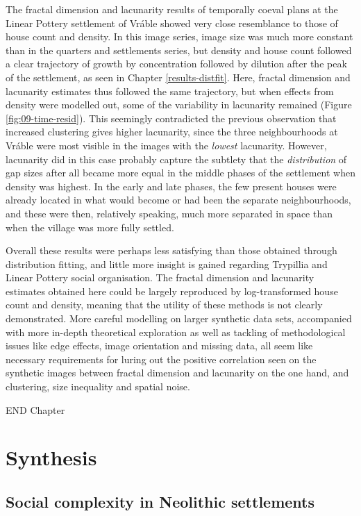 \documentclass[
  12pt,
  a4paper, twoside]{book}
\begin{document}
The fractal dimension and lacunarity results of temporally coeval plans at the Linear Pottery settlement of Vráble showed very close resemblance to those of house count and density. In this image series, image size was much more constant than in the quarters and settlements series, but density and house count followed a clear trajectory of growth by concentration followed by dilution after the peak of the settlement, as seen in Chapter \ref{results-distfit}. Here, fractal dimension and lacunarity estimates thus followed the same trajectory, but when effects from density were modelled out, some of the variability in lacunarity remained (Figure \ref{fig:09-time-resid}). This seemingly contradicted the previous observation that increased clustering gives higher lacunarity, since the three neighbourhoods at Vráble were most visible in the images with the \emph{lowest} lacunarity. However, lacunarity did in this case probably capture the subtlety that the \emph{distribution} of gap sizes after all became more equal in the middle phases of the settlement when density was highest. In the early and late phases, the few present houses were already located in what would become or had been the separate neighbourhoods, and these were then, relatively speaking, much more separated in space than when the village was more fully settled.

Overall these results were perhaps less satisfying than those obtained through distribution fitting, and little more insight is gained regarding Trypillia and Linear Pottery social organisation. The fractal dimension and lacunarity estimates obtained here could be largely reproduced by log-transformed house count and density, meaning that the utility of these methods is not clearly demonstrated. More careful modelling on larger synthetic data sets, accompanied with more in-depth theoretical exploration as well as tackling of methodological issues like edge effects, image orientation and missing data, all seem like necessary requirements for luring out the positive correlation seen on the synthetic images between fractal dimension and lacunarity on the one hand, and clustering, size inequality and spatial noise.

END Chapter

\hypertarget{part-synthesis}{%
\part{Synthesis}\label{part-synthesis}}

\hypertarget{disc-results}{%
\chapter{Social complexity in Neolithic settlements}\label{disc-results}}
\end{document}

